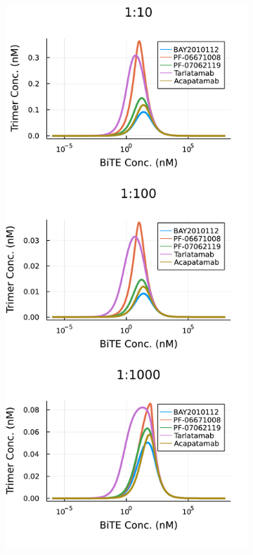 \begin{figure}
	\centering
	\begin{subfigure}[b]{0.48\textwidth}
		\centering
		\includegraphics[width=1\textwidth]{fig/solid.pdf}

\end{subfigure}
\end{figure}
